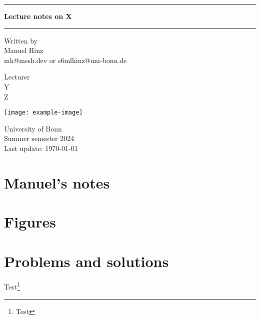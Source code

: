 \documentclass[a4paper, 10pt, oneside]{book}
\author{Manuel Hinz}
\begin{document}
\pagecolor{mycolor}
\begin{titlepage}
    \centering

    \vspace*{1cm}

    \rule{\textwidth}{1pt}

    \vspace{.7\baselineskip}
    {\huge \textbf{Lecture notes on X}}

    \rule{\textwidth}{1pt}

    \vspace{1.5cm}

    \large

    \begin{minipage}{.5\textwidth}
        \centering
        Written by \\
        Manuel Hinz\\
        {\normalsize mh@mssh.dev or s6mlhinz@uni-bonn.de}
    \end{minipage}%
    \begin{minipage}{.5\textwidth}
        \centering
        Lecturer\\
        Y  \\
        {\normalsize Z}
    \end{minipage}


    \vspace{3cm}

    \texttt{[image: example-image]}

    \vfill

    University of Bonn \\
    Summer semester 2024\\
    Last update: \today
   
\end{titlepage}
\pagecolor{white}
\tableofcontents

\restoregeometry
\setcounter{chapter}{-1}
\chapter{Manuel's notes}


\chapter{Figures}

\chapter{Problems and solutions}

\newpage 
Test\footnote{Test}
\end{document}
